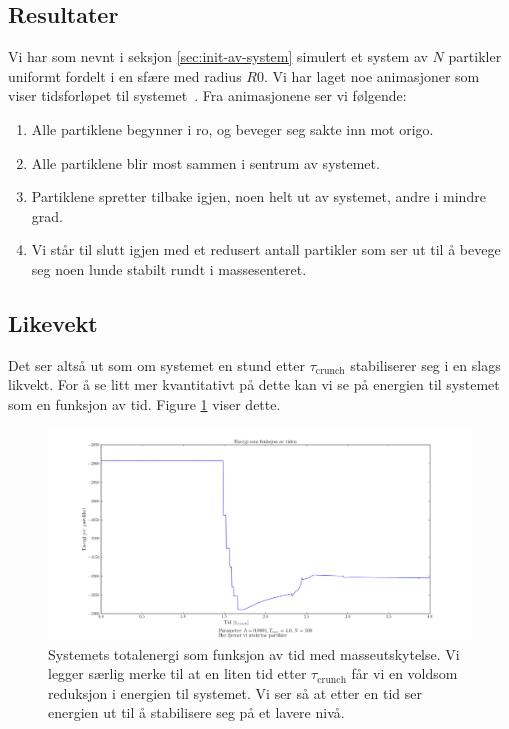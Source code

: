 \documentclass[11pt]{article}
\begin{document}

\cleardoublepage
\begin{multicols}{2}

\section{Resultater}
Vi har som nevnt i seksjon \ref{sec:init-av-system} simulert et system
av $N$ partikler uniformt fordelt i en sfære med radius $R0$. Vi har
laget noe animasjoner som viser tidsforløpet til
systemet~\cite[\texttt{project5/fig/}]{github-repo}. Fra animasjonene
ser vi følgende:
\begin{enumerate}
  \item Alle partiklene begynner i ro, og beveger seg sakte inn mot
    origo.
  \item Alle partiklene blir most sammen i sentrum av systemet.
  \item Partiklene spretter tilbake igjen, noen helt ut av systemet,
    andre i mindre grad.
  \item Vi står til slutt igjen med et redusert antall partikler som
    ser ut til å bevege seg noen lunde stabilt rundt i massesenteret.
\end{enumerate}

\subsection{Likevekt}
Det ser altså ut som om systemet en stund etter $\tau_\text{crunch}$
stabiliserer seg i en slags likvekt. For å se litt mer kvantitativt på
dette kan vi se på energien til systemet som en funksjon av tid. Figure
\ref{fig:energi-vs-tid-med-utskytning} viser dette. 

\end{multicols}
\begin{figure}[ht!]
  \centering
  \includegraphics[width=\textwidth]{../fig/energy_plot_with_ejection.png}
  \caption{\label{fig:energi-vs-tid-med-utskytning} Systemets
    totalenergi som funksjon av tid med masseutskytelse. Vi legger
    særlig merke til at en liten tid etter $\tau_\text{crunch}$ får vi
  en voldsom reduksjon i energien til systemet. Vi ser så at etter en
  tid ser energien ut til å stabilisere seg på et lavere nivå.}
\end{figure}
\end{document}
